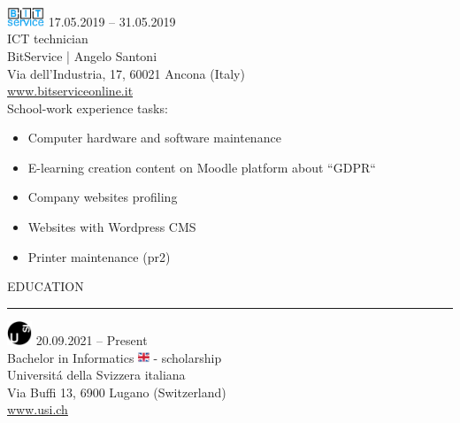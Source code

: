 \documentclass[letterpaper, 11pt]{article}
\begin{document}
\hfill\break
\includegraphics[width=3em]{logo/bitservice}
17.05.2019 – 31.05.2019\\
ICT technician\\
BitService | Angelo Santoni\\
Via dell'Industria, 17, 60021 Ancona (Italy)\\
\href{http://www.bitserviceonline.it/}
{\textcolor{linked}{www.bitserviceonline.it}}\\
School-work experience tasks:
\vspace{-0.7em}
\begin{itemize}
    \setlength{\itemsep}{1.2pt}
    \setlength{\parskip}{0.2pt}
    \setlength{\parsep}{0pt}
    \item Computer hardware and software maintenance
    \item E-learning creation content on Moodle platform about ``GDPR``
    \item Company websites profiling
    \item Websites with Wordpress CMS
    \item Printer maintenance (pr2)
\end{itemize}
\newpage
\textcolor{titlecolor}{EDUCATION}
{\color{linecolor} \rule{0.8\linewidth}{0.5mm}}
\bigskip\newline
\includegraphics[width=2em]{logo/usi}
20.09.2021 – Present\\
Bachelor in Informatics
\includegraphics[width=0.9em]{logo/uk.png}
 - scholarship\\
Universit\'a della Svizzera italiana\\
Via Buffi 13, 6900 Lugano (Switzerland)\\
\href{https://www.usi.ch/en/education/bachelor/informatics}
{\textcolor{linked}{www.usi.ch}}\\
\end{document}
